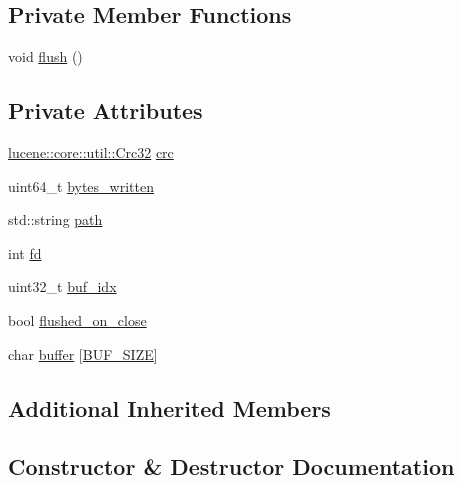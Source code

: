 \subsection*{Private Member Functions}
\begin{DoxyCompactItemize}
\item 
void \mbox{\hyperlink{classlucene_1_1core_1_1store_1_1FileIndexOutput_aa7706d871daf386d25b4104149b197ba}{flush}} ()
\end{DoxyCompactItemize}
\subsection*{Private Attributes}
\begin{DoxyCompactItemize}
\item 
\mbox{\hyperlink{classlucene_1_1core_1_1util_1_1Crc32}{lucene\+::core\+::util\+::\+Crc32}} \mbox{\hyperlink{classlucene_1_1core_1_1store_1_1FileIndexOutput_a37e7a6311596aafe6209f7542f3f7220}{crc}}
\item 
uint64\+\_\+t \mbox{\hyperlink{classlucene_1_1core_1_1store_1_1FileIndexOutput_ac3a6d5472f2827e684d1ea3597158f01}{bytes\+\_\+written}}
\item 
std\+::string \mbox{\hyperlink{classlucene_1_1core_1_1store_1_1FileIndexOutput_a4a317430eb3ae95d997dfa94c99e4d96}{path}}
\item 
int \mbox{\hyperlink{classlucene_1_1core_1_1store_1_1FileIndexOutput_a8d668aa6b67ec78c15647d317b4d495a}{fd}}
\item 
uint32\+\_\+t \mbox{\hyperlink{classlucene_1_1core_1_1store_1_1FileIndexOutput_a31edcce20628b85549a8459e6da1f614}{buf\+\_\+idx}}
\item 
bool \mbox{\hyperlink{classlucene_1_1core_1_1store_1_1FileIndexOutput_a6f23c3e87154af666af983ebfa7c7b46}{flushed\+\_\+on\+\_\+close}}
\item 
char \mbox{\hyperlink{classlucene_1_1core_1_1store_1_1FileIndexOutput_a1fc94b9489bf7bd03092f80416418b27}{buffer}} \mbox{[}\mbox{\hyperlink{classlucene_1_1core_1_1store_1_1FileIndexOutput_a9cd3556c39e4acef7fea5da7723579a5}{B\+U\+F\+\_\+\+S\+I\+ZE}}\mbox{]}
\end{DoxyCompactItemize}
\subsection*{Additional Inherited Members}


\subsection{Constructor \& Destructor Documentation}
\mbox{\label{classlucene_1_1core_1_1store_1_1FileIndexOutput_a6e625a7ba4d2b14cc5bcde77fb812e4f}} 
